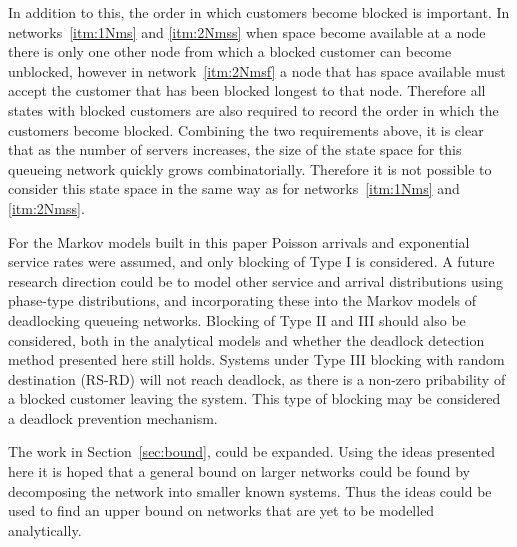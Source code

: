 \documentclass{article}
\numberwithin{equation}{section}
\begin{document}
In addition to this, the order in which customers become blocked is important.
In networks~\ref{itm:1Nms} and \ref{itm:2Nmss} when space become available at a node there is only one other node from which a blocked customer can become unblocked, however in network~\ref{itm:2Nmsf} a node that has space available must accept the customer that has been blocked longest to that node.
Therefore all states with blocked customers are also required to record the order in which the customers become blocked.
Combining the two requirements above, it is clear that as the number of servers increases, the size of the state space for this queueing network quickly grows combinatorially.
Therefore it is not possible to consider this state space in the same way as for networks~\ref{itm:1Nms} and \ref{itm:2Nmss}.

For the Markov models built in this paper Poisson arrivals and exponential service rates were assumed, and only blocking of Type I is considered.
A future research direction could be to model other service and arrival distributions using phase-type distributions, and incorporating these into the Markov models of deadlocking queueing networks.
Blocking of Type II and III should also be considered, both in the analytical models and whether the deadlock detection method presented here still holds.
Systems under Type III blocking with random destination (RS-RD) will not reach deadlock, as there is a non-zero pribability of a blocked customer leaving the system.
This type of blocking may be considered a deadlock prevention mechanism.

The work in Section~\ref{sec:bound}, could be expanded.
Using the ideas presented here it is hoped that a general bound on larger networks could be found by decomposing the network into smaller known systems.
Thus the ideas could be used to find an upper bound on networks that are yet to be modelled analytically.





\end{document}
